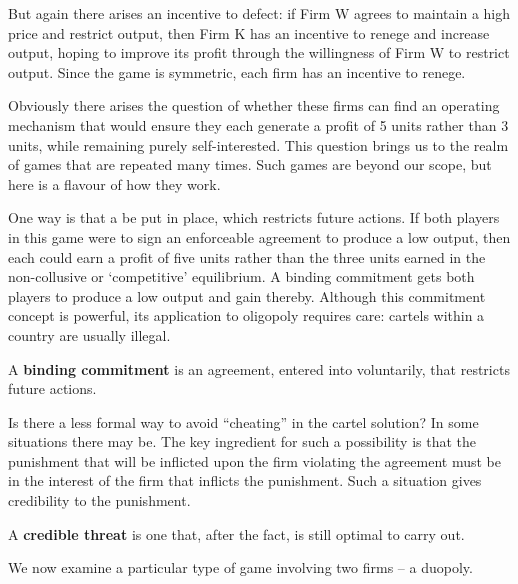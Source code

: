 But again there arises an incentive to defect: if Firm W agrees to maintain a high price and restrict output, then Firm K has an incentive to renege and increase output, hoping to improve its profit through the willingness of Firm W to restrict output. Since the game is symmetric, each firm has an incentive to renege. 

Obviously there arises the question of whether these firms can find an operating mechanism that would ensure they each generate a profit of 5 units rather than 3 units, while remaining purely self-interested. This question brings us to the realm of games that are repeated many times. Such games are beyond our scope, but here is a flavour of how they work.

One way is that a  be put in place, which restricts future actions. If both players in this game were to sign an enforceable agreement to produce a low output, then each could earn a profit of five units rather than the three units earned in the non-collusive or `competitive' equilibrium. A binding commitment gets both players to produce a low output and gain thereby. Although this commitment concept is powerful, its application to oligopoly requires care: cartels within a country are usually illegal.

\begin{DefBox}
A \textbf{binding commitment} is an agreement, entered into voluntarily, that restricts future actions.
\end{DefBox}

Is there a less formal way to avoid ``cheating'' in the cartel solution? In some situations there may be. The key ingredient for such a possibility is that the punishment that will be inflicted upon the firm violating the agreement must be in the interest of the firm that inflicts the punishment. Such a situation gives credibility to the punishment. 

\begin{DefBox}
A \textbf{credible threat} is one that, after the fact, is still optimal to carry out.
\end{DefBox}

We now examine a particular type of game involving two firms -- a duopoly.